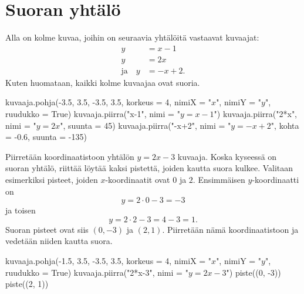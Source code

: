 \section{Suoran yhtälö}


Alla on kolme kuvaa, joihin on seuraavia yhtälöitä vastaavat kuvaajat:
\begin{align*}
y & =x-1 \\
y & =2x \\
\text{ja} \quad y & =-x+2.
\end{align*}
Kuten huomataan, kaikki kolme kuvaajaa ovat suoria.

\begin{kuva}
    kuvaaja.pohja(-3.5, 3.5, -3.5, 3.5, korkeus = 4, nimiX = "$x$", nimiY = "$y$", ruudukko = True)
    kuvaaja.piirra("x-1", nimi = "$y=x-1$")
    kuvaaja.piirra("2*x", nimi = "$y=2x$", suunta = 45)
    kuvaaja.piirra("-x+2", nimi = "$y=-x+2$", kohta = -0.6, suunta = -135)
\end{kuva}




\begin{esimerkki} Piirretään koordinaatistoon yhtälön $y=2x-3$ kuvaaja. Koska kyseessä on suoran yhtälö, riittää löytää kaksi pistettä, joiden kautta suora kulkee.
Valitaan esimerkiksi pisteet, joiden $x$-koordinaatit ovat $0$ ja $2$. Ensimmäisen $y$-koordinaatti on
\[
y=2\cdot 0-3=-3
\]
ja toisen
\[
y=2\cdot 2-3=4-3=1.
\]
Suoran pisteet ovat siis $(0, -3)$ ja $(2, 1)$. Piirretään nämä koordinaatistoon ja vedetään niiden kautta suora.

\begin{kuva}
    kuvaaja.pohja(-1.5, 3.5, -3.5, 3.5, korkeus = 4, nimiX = "$x$", nimiY = "$y$", ruudukko = True)
    kuvaaja.piirra("2*x-3", nimi = "$y=2x-3$")
    piste((0, -3))
    piste((2, 1))
\end{kuva}

\end{esimerkki}

